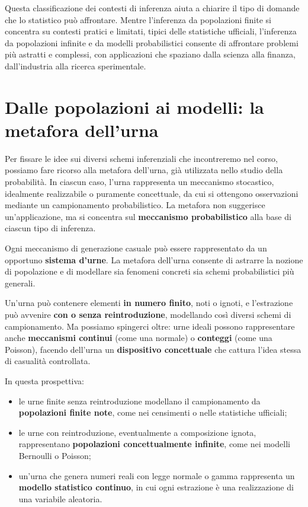 \documentclass[
  11pt,
]{book}
\providecommand{\tightlist}{%
  \setlength{\itemsep}{0pt}\setlength{\parskip}{0pt}}
\theoremstyle{mytheoremstyle}
\theoremstyle{mydefstyle}
\begin{document}
Questa classificazione dei contesti di inferenza aiuta a chiarire il tipo di domande che lo statistico può affrontare. Mentre l'inferenza da popolazioni finite si concentra su contesti pratici e limitati, tipici delle statistiche ufficiali, l'inferenza da popolazioni infinite e da modelli probabilistici consente di affrontare problemi più astratti e complessi, con applicazioni che spaziano dalla scienza alla finanza, dall'industria alla ricerca sperimentale.

\section{Dalle popolazioni ai modelli: la metafora dell'urna}\label{dalle-popolazioni-ai-modelli-la-metafora-dellurna}

Per fissare le idee sui diversi schemi inferenziali che incontreremo nel corso, possiamo fare ricorso alla metafora dell'urna, già utilizzata nello studio della probabilità. In ciascun caso, l'urna rappresenta un meccanismo stocastico, idealmente realizzabile o puramente concettuale, da cui si ottengono osservazioni mediante un campionamento probabilistico. La metafora non suggerisce un'applicazione, ma si concentra sul \textbf{meccanismo probabilistico} alla base di ciascun tipo di inferenza.

Ogni meccanismo di generazione casuale può essere rappresentato da un opportuno \textbf{sistema d'urne}. La metafora dell'urna consente di astrarre la nozione di popolazione e di modellare sia fenomeni concreti sia schemi probabilistici più generali.

Un'urna può contenere elementi \textbf{in numero finito}, noti o ignoti, e l'estrazione può avvenire \textbf{con o senza reintroduzione}, modellando così diversi schemi di campionamento. Ma possiamo spingerci oltre: urne ideali possono rappresentare anche \textbf{meccanismi continui} (come una normale) o \textbf{conteggi} (come una Poisson), facendo dell'urna un \textbf{dispositivo concettuale} che cattura l'idea stessa di casualità controllata.

In questa prospettiva:

\begin{itemize}
\tightlist
\item
  le urne finite senza reintroduzione modellano il campionamento da \textbf{popolazioni finite note}, come nei censimenti o nelle statistiche ufficiali;
\item
  le urne con reintroduzione, eventualmente a composizione ignota, rappresentano \textbf{popolazioni concettualmente infinite}, come nei modelli Bernoulli o Poisson;
\item
  un'urna che genera numeri reali con legge normale o gamma rappresenta un \textbf{modello statistico continuo}, in cui ogni estrazione è una realizzazione di una variabile aleatoria.
\end{itemize}
\end{document}
